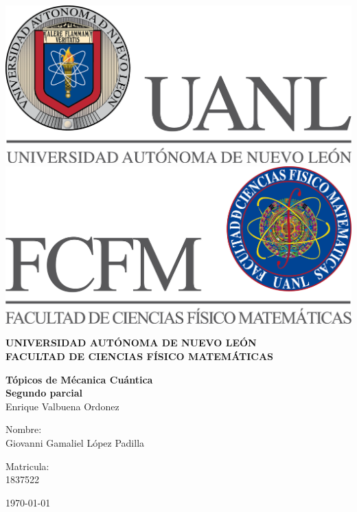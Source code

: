 \begin{titlepage}
    \begin{center}
    \includegraphics[scale=0.40]{../../Logos/uanl.png} 
    \hspace{2.5cm}
    \includegraphics[scale=0.40]{../../Logos/fcfm.png}
    \end{center}
    \vspace{2cm}
    \begin{center}
    \textbf{
    UNIVERSIDAD AUTÓNOMA DE NUEVO LEÓN\\
    FACULTAD DE CIENCIAS
        FÍSICO MATEMÁTICAS}\\
    \vspace*{2cm}
    \begin{large}
    \vspace{1cm}
    \large{\textbf{Tópicos de Mécanica Cuántica}}\\
    \textbf{Segundo parcial}\\
    Enrique Valbuena Ordonez\\
    \end{large}
    \vspace{3.5cm}
    \begin{minipage}{0.6\linewidth}
    \vspace{0.5cm}
    \changefontsizes{14pt}
    Nombre:\\
    Giovanni Gamaliel López Padilla\\
    \end{minipage}
    \begin{minipage}{0.2\linewidth}
    \changefontsizes{14pt}
    Matricula:\\
    1837522
    \end{minipage}
    \end{center}
    \vspace{4cm}
    \begin{flushright}
    \today
    \end{flushright}
    \end{titlepage}